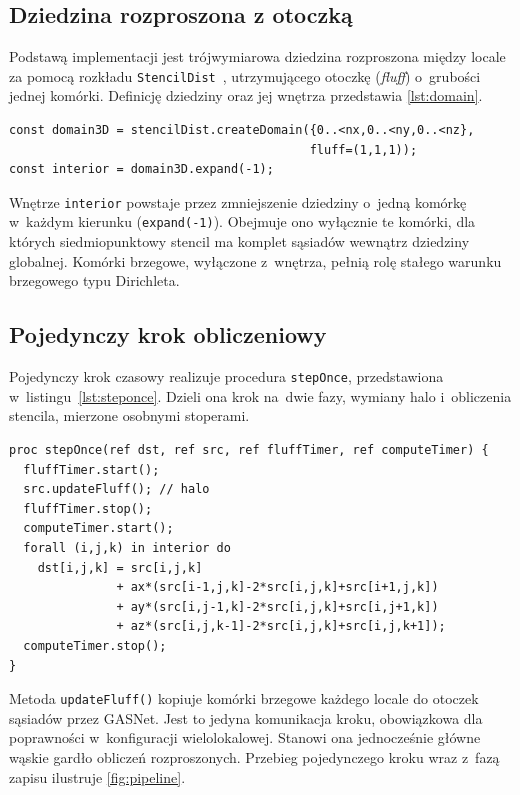 \subsection{Dziedzina rozproszona z otoczką}

Podstawą implementacji jest trójwymiarowa dziedzina rozproszona między locale za pomocą rozkładu \texttt{StencilDist}~\cite{stencildist}, utrzymującego otoczkę (\emph{fluff}) o~grubości jednej komórki. Definicję dziedziny oraz jej wnętrza przedstawia \cref{lst:domain}.

\begin{lstlisting}[language=Chapel, caption={Definicja dziedziny rozproszonej z jednokomórkową otoczką oraz jej wnętrza.}, label={lst:domain}]
const domain3D = stencilDist.createDomain({0..<nx,0..<ny,0..<nz},
                                          fluff=(1,1,1));
const interior = domain3D.expand(-1);
\end{lstlisting}

Wnętrze \texttt{interior} powstaje przez zmniejszenie dziedziny o~jedną komórkę w~każdym kierunku (\texttt{expand(-1)}). Obejmuje ono wyłącznie te komórki, dla których siedmiopunktowy stencil ma komplet sąsiadów wewnątrz dziedziny globalnej. Komórki brzegowe, wyłączone z~wnętrza, pełnią rolę stałego warunku brzegowego typu Dirichleta.

\subsection{Pojedynczy krok obliczeniowy}

Pojedynczy krok czasowy realizuje procedura \texttt{stepOnce}, przedstawiona w~listingu~\ref{lst:steponce}. Dzieli ona krok na~dwie fazy, wymiany halo i~obliczenia stencila, mierzone osobnymi stoperami.

\begin{lstlisting}[language=Chapel, caption={Procedura pojedynczego kroku: wymiana halo, a następnie obliczenie stencila.}, label={lst:steponce}]
proc stepOnce(ref dst, ref src, ref fluffTimer, ref computeTimer) {
  fluffTimer.start(); 
  src.updateFluff(); // halo
  fluffTimer.stop();
  computeTimer.start();
  forall (i,j,k) in interior do
    dst[i,j,k] = src[i,j,k]
               + ax*(src[i-1,j,k]-2*src[i,j,k]+src[i+1,j,k])
               + ay*(src[i,j-1,k]-2*src[i,j,k]+src[i,j+1,k])
               + az*(src[i,j,k-1]-2*src[i,j,k]+src[i,j,k+1]);
  computeTimer.stop();
}
\end{lstlisting}

Metoda \texttt{updateFluff()} kopiuje komórki brzegowe każdego locale do otoczek sąsiadów przez GASNet. Jest to jedyna komunikacja kroku, obowiązkowa dla poprawności w~konfiguracji wielolokalowej. Stanowi ona jednocześnie główne wąskie gardło obliczeń rozproszonych. Przebieg pojedynczego kroku wraz z~fazą zapisu ilustruje \cref{fig:pipeline}.

